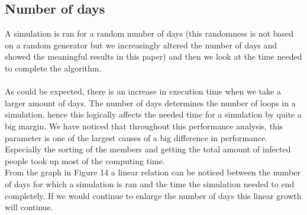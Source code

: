 \documentclass[runningheads]{llncs}
\begin{document}
\subsection{Number of days}
A simulation is ran for a random number of days (this randomness is not based on a random generator but we increasingly altered the number of days and showed the meaningful results in this paper) and then we look at the time needed to complete the algorithm. \\ 
\\
As could be expected, there is an increase in execution time when we take a larger amount of days. The number of days determines the number of loops in a simulation, hence this logically affects the needed time for a simulation by quite a big margin. We have noticed that throughout this performance analysis, this parameter is one of the largest causes of a big difference in performance. Especially the sorting of the members and getting the total amount of infected people took up most of the computing time.\\
From the graph in Figure 14 a linear relation can be noticed between the number of days for which a simulation is ran and the time the simulation needed to end completely. If we would continue to enlarge the number of days this linear growth will continue.
\end{document}
